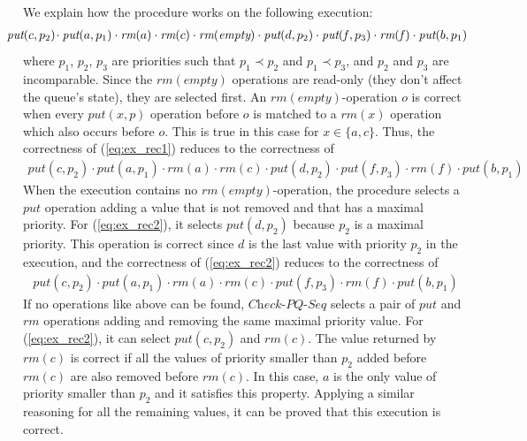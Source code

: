 We explain how the procedure works on the following execution:
\begin{align}
\hspace{-5mm}\textit{put}(c,p_2)\hspace{-.5mm} \cdot \textit{put}(a,p_1) \cdot \textit{rm}(a) \cdot \textit{rm}(c) \cdot \textit{rm}(\textit{empty}) \cdot \textit{put}(d,p_2) \cdot \textit{put}(\mathit{f},p_3) \cdot \textit{rm}(\mathit{f}) \cdot \textit{put}(b,p_1)\label{eq:ex_rec1}
\end{align}
where $p_1$, $p_2$, $p_3$ are priorities such that $p_1 \prec p_2$ and $p_1 \prec p_3$, and $p_2$ and $p_3$ are incomparable. Since the $\textit{rm}(\textit{empty})$ operations
are read-only (they don't affect the queue's state), they are selected first. An $\textit{rm}(\textit{empty})$-operation $o$ is correct when every $\textit{put}(x,p)$ operation before $o$ is matched to a $\textit{rm}(x)$ operation which also occurs before $o$. This is true in this case for $x\in \{a,c\}$. Thus, the correctness of (\ref{eq:ex_rec1}) reduces to the correctness of
\begin{align}
\textit{put}(c,p_2) \cdot \textit{put}(a,p_1) \cdot \textit{rm}(a) \cdot \textit{rm}(c) \cdot \textit{put}(d,p_2) \cdot \textit{put}(f,p_3) \cdot \textit{rm}(f) \cdot \textit{put}(b,p_1)\label{eq:ex_rec2}
\end{align}
When the execution contains no $\textit{rm}(\textit{empty})$-operation, the procedure selects a $\textit{put}$ operation adding a value that is not removed and that has a maximal priority. For (\ref{eq:ex_rec2}), it selects $\textit{put}(d,p_2)$ because $p_2$ is a maximal priority. This operation is correct since $d$ is the last value with priority $p_2$ in the execution, and the correctness of (\ref{eq:ex_rec2}) reduces to the correctness of
\begin{align}
\textit{put}(c,p_2) \cdot \textit{put}(a,p_1) \cdot \textit{rm}(a) \cdot \textit{rm}(c) \cdot \textit{put}(f,p_3) \cdot \textit{rm}(f) \cdot \textit{put}(b,p_1)\label{eq:ex_rec3}
\end{align}
If no operations like above can be found, $\textit{Check-PQ-Seq}$ selects a pair of $\textit{put}$ and $\textit{rm}$ operations adding and removing the same maximal priority value. For (\ref{eq:ex_rec2}), it can select
$\textit{put}(c,p_2)$ and $\textit{rm}(c)$. The value returned by $\textit{rm}(c)$ is correct if all the values of priority smaller than $p_2$ added before $\textit{rm}(c)$ are also removed before $\textit{rm}(c)$. In this case, $a$ is the only value of priority smaller than $p_2$ and it satisfies this property. Applying a similar reasoning for all the remaining values, it can be proved that this execution is correct.

